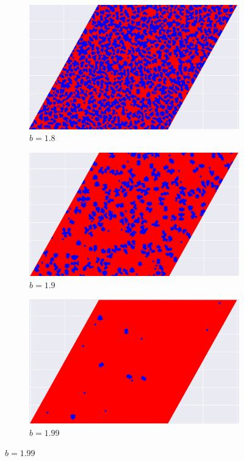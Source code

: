 \documentclass[12pt]{article}
\begin{document}
\begin{figure}[!htbp]
        \begin{subfigure}{.33\textwidth}
          \centering
          \includegraphics[width=.9\linewidth]{TriangularMeanFieldGame/triangular_snapshot_b=18.jpg}
          \caption{$b=1.8$}
          \label{fig:trsub7}
        \end{subfigure}%
        \begin{subfigure}{.33\textwidth}
          \centering
          \includegraphics[width=.9\linewidth]{TriangularMeanFieldGame/triangular_snapshot_b=19.jpg}
          \caption{$b=1.9$}
          \label{fig:trsub8}
        \end{subfigure}%
        \begin{subfigure}{.33\textwidth}
          \centering
          \includegraphics[width=.9\linewidth]{TriangularMeanFieldGame/triangular_snapshot_b=199.jpg}
          \caption{$b=1.99$}
          \label{fig:trsub9}
        \end{subfigure}
    

\end{figure}
\end{document}
